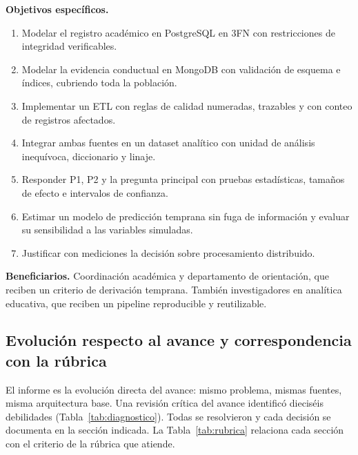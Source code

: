 \documentclass[11pt,a4paper]{article}
\begin{document}
\textbf{Objetivos específicos.}
\begin{enumerate}[label=OE\arabic*.]
\item Modelar el registro académico en PostgreSQL en 3FN con restricciones de integridad verificables.
\item Modelar la evidencia conductual en MongoDB con validación de esquema e índices, cubriendo toda la población.
\item Implementar un ETL con reglas de calidad numeradas, trazables y con conteo de registros afectados.
\item Integrar ambas fuentes en un dataset analítico con unidad de análisis inequívoca, diccionario y linaje.
\item Responder P1, P2 y la pregunta principal con pruebas estadísticas, tamaños de efecto e intervalos de confianza.
\item Estimar un modelo de predicción temprana sin fuga de información y evaluar su sensibilidad a las variables simuladas.
\item Justificar con mediciones la decisión sobre procesamiento distribuido.
\end{enumerate}

\textbf{Beneficiarios.} Coordinación académica y departamento de orientación, que reciben un
criterio de derivación temprana. También investigadores en analítica educativa, que reciben un
pipeline reproducible y reutilizable.

\subsection{Evolución respecto al avance y correspondencia con la rúbrica}
El informe es la evolución directa del avance: mismo problema, mismas fuentes, misma arquitectura
base. Una revisión crítica del avance identificó dieciséis debilidades (Tabla~\ref{tab:diagnostico}).
Todas se resolvieron y cada decisión se documenta en la sección indicada. La
Tabla~\ref{tab:rubrica} relaciona cada sección con el criterio de la rúbrica que atiende.
\end{document}
